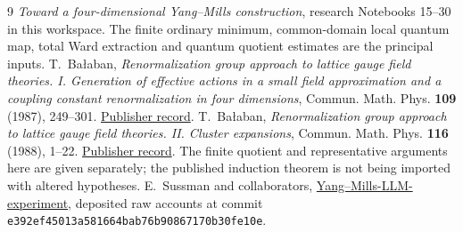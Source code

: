 \begin{thebibliography}{9}
\emph{Toward a four-dimensional Yang--Mills construction},
research Notebooks 15--30 in this workspace. The finite ordinary
minimum, common-domain local quantum map, total Ward extraction
and quantum quotient estimates are the principal inputs.
T.~Ba\l aban,
\emph{Renormalization group approach to lattice gauge field
theories. I. Generation of effective actions in a small field
approximation and a coupling constant renormalization in four
dimensions},
Commun. Math. Phys. \textbf{109} (1987), 249--301.
\href{https://doi.org/10.1007/BF01215223}{Publisher record}.
T.~Ba\l aban,
\emph{Renormalization group approach to lattice gauge field
theories. II. Cluster expansions},
Commun. Math. Phys. \textbf{116} (1988), 1--22.
\href{https://doi.org/10.1007/BF01239022}{Publisher record}.
The finite quotient and representative arguments here are given
separately; the published induction theorem is not being imported
with altered hypotheses.
E.~Sussman and collaborators,
\href{https://github.com/ethanwsussman/Yang--Mills-LLM-experiment}
{Yang--Mills-LLM-experiment}, deposited raw accounts at commit
\texttt{e392ef45013a581664bab76b90867170b30fe10e}.
\end{thebibliography}

